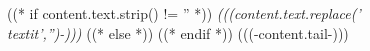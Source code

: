 ((* if content.text.strip() != '' *)) \emph{(((content.text.replace('\\textit','')-)))} ((* else *))
((* endif *))
 (((-content.tail-))) 

